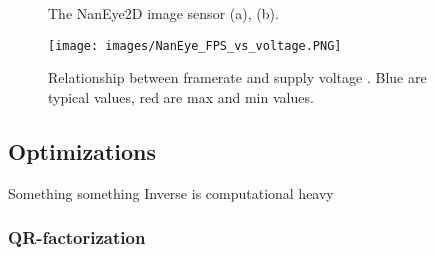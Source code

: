 


\begin{figure}[H]
\begin{minipage}[]{.5\linewidth}
\centering
{}
\end{minipage}%
\begin{minipage}[]{.5\linewidth}
\centering
\end{minipage}

\caption{The NanEye2D image sensor (a), (b).}
\label{fig:NanEye2D}
\end{figure}




\begin{figure}[H]
\centering
   \texttt{[image: images/NanEye\_FPS\_vs\_voltage.PNG]}
  \caption{ Relationship between framerate and supply voltage \cite{Eyes_of_things_NanEye}. Blue are typical values, red are max and min values. } 
  \label{fig:FPS_vs_voltage}
\end{figure}


 
 \subsection{Optimizations}
 Something something Inverse is computational heavy
 \subsubsection{QR-factorization}
